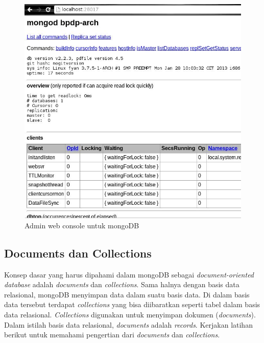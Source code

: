   \begin{figure}
    \begin{center}
      \includegraphics[scale=0.5]{images/mongodb-web-interface.jpg}
    \end{center}
    \caption{Admin web console untuk mongoDB}
    \label{fig:mongowebadminconsole}
  \end{figure}


\subsection{Documents dan Collections}

Konsep dasar yang harus dipahami dalam mongoDB sebagai \textit{document-oriented database} adalah \textit{documents} dan \textit{collections}. Sama halnya dengan basis data relasional, mongoDB menyimpan data dalam suatu basis data. Di dalam basis data tersebut terdapat \textit{collections} yang bisa diibaratkan seperti tabel dalam basis data relasional. \textit{Collections} digunakan untuk menyimpan dokumen (\textit{documents}). Dalam istilah basis data relasional, \textit{documents} adalah \textit{records}. Kerjakan latihan berikut untuk memahami pengertian dari \textit{documents} dan \textit{collections}.

